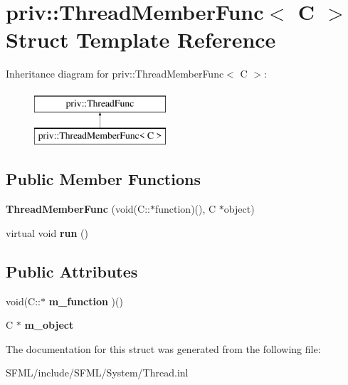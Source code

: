 \hypertarget{structpriv_1_1_thread_member_func}{}\section{priv\+:\+:Thread\+Member\+Func$<$ C $>$ Struct Template Reference}
\label{structpriv_1_1_thread_member_func}
Inheritance diagram for priv\+:\+:Thread\+Member\+Func$<$ C $>$\+:\begin{figure}[H]
\begin{center}
\leavevmode
\includegraphics[height=2.000000cm]{structpriv_1_1_thread_member_func}
\end{center}
\end{figure}
\subsection*{Public Member Functions}
\begin{DoxyCompactItemize}
\item 
\mbox{\label{structpriv_1_1_thread_member_func_ae44619c4cf6d886da6f32a1de37d652e}} 
{\bfseries Thread\+Member\+Func} (void(C\+::$\ast$function)(), C $\ast$object)
\item 
\mbox{\label{structpriv_1_1_thread_member_func_abbd440e93edf2747cf9cdde579bc5de0}} 
virtual void {\bfseries run} ()
\end{DoxyCompactItemize}
\subsection*{Public Attributes}
\begin{DoxyCompactItemize}
\item 
\mbox{\label{structpriv_1_1_thread_member_func_a2b3e753f87b70ae3ad1c4ff54a995fe8}} 
void(C\+::$\ast$ {\bfseries m\+\_\+function} )()
\item 
\mbox{\label{structpriv_1_1_thread_member_func_a849dd2e31c95e699fb316065d9d75116}} 
C $\ast$ {\bfseries m\+\_\+object}
\end{DoxyCompactItemize}


The documentation for this struct was generated from the following file\+:\begin{DoxyCompactItemize}
\item 
S\+F\+M\+L/include/\+S\+F\+M\+L/\+System/Thread.\+inl\end{DoxyCompactItemize}
